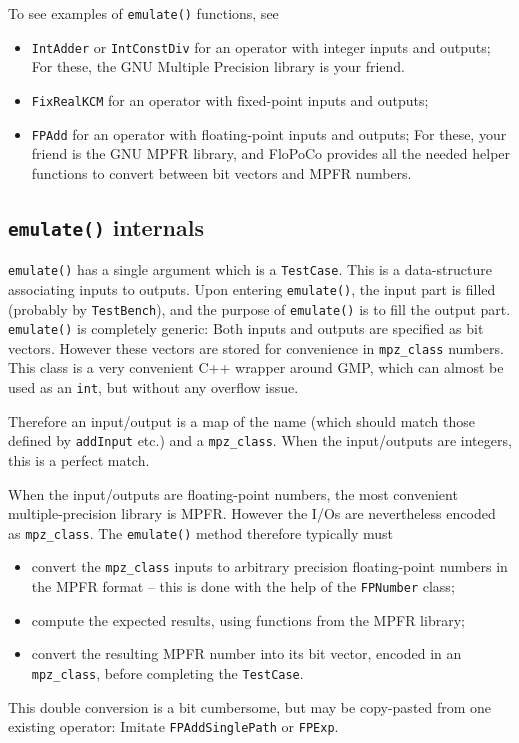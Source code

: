 \documentclass{article}
\begin{document}
To see examples of \texttt{emulate()} functions, see
\begin{itemize}
\item \texttt{IntAdder} or \texttt{IntConstDiv} for an operator with integer inputs and outputs;
  For these, the GNU Multiple Precision library is your friend.
\item \texttt{FixRealKCM} for an operator with fixed-point inputs and outputs;
\item \texttt{FPAdd}  for an operator with floating-point inputs and outputs;
  For these, your friend is the GNU MPFR library, and FloPoCo provides all the needed helper functions to convert between bit vectors and MPFR numbers.
\end{itemize}


\subsection{\texttt{emulate()}  internals}
\texttt{\small emulate()} has a single argument which is a \texttt{\small TestCase}.
This is a data-structure associating inputs to outputs.
Upon entering \texttt{\small emulate()}, the input part is filled (probably by \texttt{\small TestBench}), and the purpose of \texttt{\small emulate()} is to fill the output part.
\texttt{\small emulate()} is completely generic:
Both inputs and outputs are specified as bit vectors.
However these vectors are stored for convenience in \texttt{\small mpz\_class} numbers.
This class is a very convenient C++ wrapper around GMP, which can almost be used as an \texttt{\small int}, but without any overflow issue.

Therefore an input/output is a map of the name (which should match those defined by \texttt{\small addInput} etc.) and a \texttt{\small mpz\_class}.
When the input/outputs are integers, this is a perfect match.

When the input/outputs are floating-point numbers, the most convenient multiple-precision library is MPFR.
However the I/Os  are nevertheless encoded as \texttt{\small mpz\_class}.
The \texttt{\small emulate()} method therefore typically must
\begin{itemize}
\item convert the \texttt{\small mpz\_class} inputs to arbitrary precision floating-point numbers in the MPFR format -- this is done with the help of the \texttt{\small FPNumber} class;
\item compute the expected results, using functions from the MPFR library;
\item convert the resulting MPFR number into its bit vector, encoded in an \texttt{\small mpz\_class}, before completing the \texttt{\small TestCase}. 
\end{itemize}
This double conversion is a bit cumbersome, but may be copy-pasted from one existing operator: Imitate \texttt{\small FPAddSinglePath} or \texttt{\small FPExp}.
\end{document}
